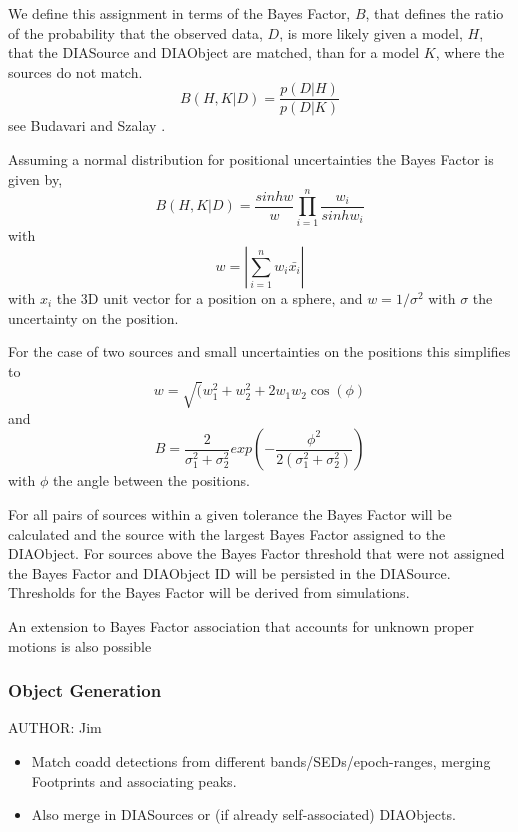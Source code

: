 We define this assignment in terms of the Bayes Factor, $B$, that defines
the ratio of the probability that the observed data, $D$, is more
likely given a model, $H$, that the DIASource and DIAObject are
matched, than for a model $K$, where the sources do not match. 
\begin{equation}
B(H,K|D) = \frac{p(D|H)}{p(D|K)}
\end{equation}
see Budavari and Szalay \cite{budavariSzalay2008}.

Assuming a normal distribution for positional uncertainties the Bayes
Factor is given by, 
\begin{equation} 
B(H,K|D) = \frac{sinh w}{w} \prod_{i=1}^n \frac{w_i}{sinh w_i}
\end{equation} 
with 
\begin{equation}
w = |\sum_{i=1}^n w_i \bar{x_i} |
\end{equation}
with $x_i$ the 3D unit vector for a position on a sphere, and
$w=1/\sigma^2$ with $\sigma$ the uncertainty on the position.

For the case of two sources and small uncertainties on the positions this simplifies to 
\begin{equation}
w = \sqrt(w_1^2 + w_2^2 +2 w_1 w_2 \cos(\phi)
\end{equation}
and
\begin{equation}
B=\frac{2}{\sigma_1^2 + \sigma_2^2} exp(-\frac{\phi^2}{2(\sigma_1^2 + \sigma_2^2)})
\end{equation}
with $\phi$ the angle between the positions.

For all pairs of sources within a given tolerance the Bayes Factor
will be calculated and the source with the largest Bayes Factor
assigned to the DIAObject. For sources above the Bayes Factor
threshold that were not assigned the Bayes Factor and DIAObject ID
will be persisted in the DIASource. Thresholds for the Bayes Factor
will be derived from simulations.

An extension to Bayes Factor association that accounts for unknown
proper motions is also possible \citep{???}

\subsubsection{Object Generation}
\label{sec:acObjectGeneration}
AUTHOR: Jim
\begin{itemize}
\item Match coadd detections from different bands/SEDs/epoch-ranges, merging Footprints and associating peaks.
\item Also merge in DIASources or (if already self-associated) DIAObjects.
\end{itemize}

